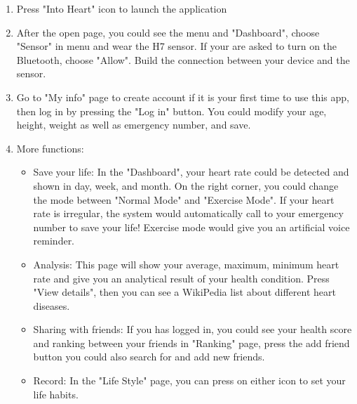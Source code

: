 \begin{enumerate}
\item Press "Into Heart" icon to launch the application 
\item After the open page, you could see the menu and "Dashboard", choose "Sensor" in menu and wear the H7 sensor. If your are asked to turn on the Bluetooth, choose "Allow". Build the connection between your device and the sensor. 
\item Go to "My info" page to create account if it is your first time to use this app, then log in by pressing the "Log in" button. You could modify your age, height, weight as well as emergency number, and save.  
\item More functions: 
\begin{itemize}
\item Save your life: In the "Dashboard", your heart rate could be detected and shown in day, week, and month. On the right corner, you could change the mode between "Normal Mode" and "Exercise Mode". If your heart rate is irregular, the system would automatically call to your emergency number to save your life! Exercise mode would give you an artificial voice reminder. 
\item Analysis: This page will show your average, maximum, minimum heart rate and give you an analytical result of your health condition. Press "View details", then you can see a WikiPedia list about different heart diseases.  
\item Sharing with friends: If you has logged in, you could see your health score and ranking between your friends in "Ranking" page, press the add friend button you could also search for and add new friends. 
\item Record: In the "Life Style" page, you can press on either icon to set your life habits. 
\end{itemize}
\end{enumerate}